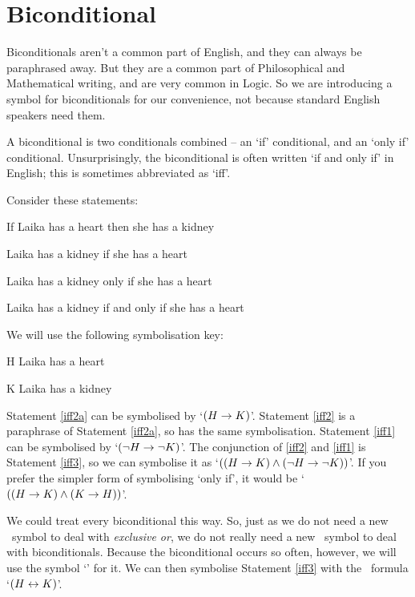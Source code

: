 \documentclass[PHIL101-Textbook.tex]{subfiles}
\begin{document}
\section{Biconditional}
Biconditionals aren't a common part of English, and they can always be paraphrased away. But they are a common part of Philosophical and Mathematical writing, and are very common in Logic. So we are introducing a symbol for biconditionals for our convenience, not because standard English speakers need them.

A biconditional is two conditionals combined -- an `if' conditional, and an `only if' conditional. Unsurprisingly, the biconditional is often written `if and only if' in English; this is sometimes abbreviated as `iff'.

Consider these statements:
\begin{earg}
\item[\ex{iff2a}] If Laika has a heart then she has a kidney 
\item[\ex{iff2}] Laika has a kidney if she has a heart
\item[\ex{iff1}] Laika has a kidney only if she has a heart
\item[\ex{iff3}] Laika has a kidney if and only if she has a heart
\end{earg}
We will use the following symbolisation key:
\begin{ekey}
\item[H] Laika has a heart
\item[K] Laika has a kidney
\end{ekey}
Statement \ref{iff2a} can be symbolised by `$(H \rightarrow K)$'. Statement \ref{iff2} is a paraphrase of Statement \ref{iff2a}, so has the same symbolisation. Statement \ref{iff1} can be symbolised by `$(\neg H \rightarrow \neg K)$'. The conjunction of \ref{iff2} and \ref{iff1} is Statement \ref{iff3}, so we can symbolise it as `$((H \rightarrow K) \land(\neg H \rightarrow \neg K))$'. If you prefer the simpler form of symbolising `only if', it would be `$((H \rightarrow K) \land (K \rightarrow H))$'. 

We could treat every biconditional this way. So, just as we do not need a new \tfl\ symbol to deal with \emph{exclusive or}, we do not really need a new \tfl\ symbol to deal with biconditionals. 
Because the biconditional occurs so often, however, we will use the symbol `\eiff' for it. We can then symbolise Statement \ref{iff3} with the \tfl\ formula `$(H \leftrightarrow K)$'. 


\end{document}
